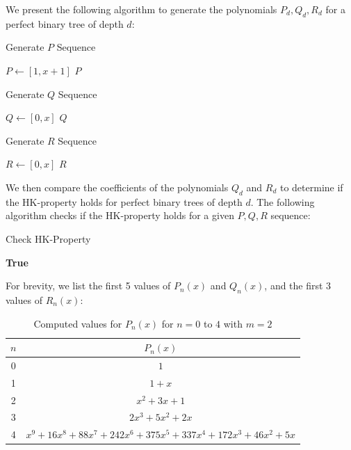 \documentclass{amsart}
\theoremstyle{definition}
\begin{document}
\begin{appendix}
	We present the following algorithm to generate the polynomials $P_d, Q_d, R_d$ for a perfect binary tree of depth $d$:

	\begin{algorithm}[H]
		\caption{Generate $P$ Sequence}
		$P \gets [1, x+1]$\;
		\Return $P$
	\end{algorithm}

	\begin{algorithm}[H]
		\caption{Generate $Q$ Sequence}
		$Q \gets [0, x]$\;
		\Return $Q$
	\end{algorithm}

	\begin{algorithm}[H]
		\caption{Generate $R$ Sequence}
		$R \gets [0, x]$\;
		\Return $R$
	\end{algorithm}

	\vspace{1cm}
	We then compare the coefficients of the polynomials $Q_d$ and $R_d$ to determine if the HK-property holds for perfect binary trees of depth $d$. The following algorithm checks if the HK-property holds for a given $P, Q, R$ sequence:
	\newline

	\begin{algorithm}[H]
		\caption{Check HK-Property}
		\Return \textbf{True}
	\end{algorithm}

For brevity, we list the first 5 values of $P_n(x)$ and $Q_n(x)$, and the first 3 values of $R_n(x)$:

\begin{table}[h]
    \centering
    \begin{tabular}{c|c}
        \hline
        $n$ & $P_n(x)$ \\
        \hline
        0 & $1$ \\
        1 & $1 + x$ \\
        2 & $x^2 + 3x + 1$ \\
        3 & $2x^3 + 5x^2 + 2x$ \\
        4 & $x^9 + 16x^8 + 88x^7 + 242x^6 + 375x^5 + 337x^4 + 172x^3 + 46x^2 + 5x$ \\
        \hline
    \end{tabular}
    \caption{Computed values for $P_n(x)$ for $n=0$ to $4$ with $m=2$}
    \label{tab:values_P}
\end{table}


\end{appendix}
\end{document}
